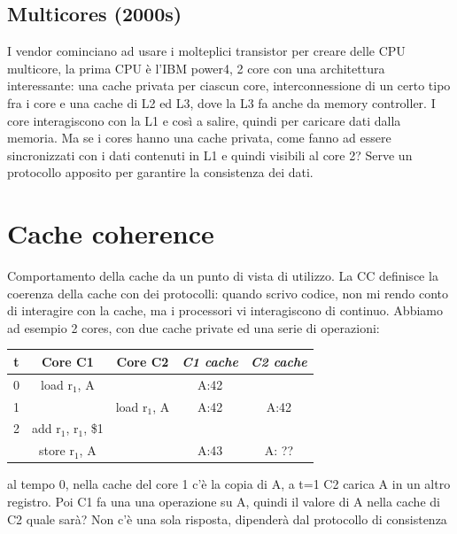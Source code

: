 \documentclass[12pt, oneside]{extbook} %
\begin{document}
\subsection{Multicores (2000s)}
I vendor cominciano ad usare i molteplici transistor per creare delle CPU multicore, la prima CPU è l'IBM power4, 2 core con una architettura interessante: una cache privata per ciascun core, interconnessione di un certo tipo fra i core e una cache di L2 ed L3, dove la L3 fa anche da memory controller. I core interagiscono con la L1 e così a salire, quindi per caricare dati dalla memoria. Ma se i cores hanno una cache privata, come fanno ad essere sincronizzati con i dati contenuti in L1 e quindi visibili al core 2? Serve un protocollo apposito per garantire la consistenza dei dati.

\section{Cache coherence}
Comportamento della cache da un punto di vista di utilizzo. La CC definisce la coerenza della cache con dei protocolli: quando scrivo codice, non mi rendo conto di interagire con la cache, ma i processori vi interagiscono di continuo. Abbiamo ad esempio 2 cores, con due cache private ed una serie di operazioni:
\begin{table}[!h]
	\begin{tabular}{|c|c|c|c|c|}
		t & \textbf{Core C1} & \textbf{
		Core C2} & \textit{C1 cache} & \textit{C2 cache}\\
		\hline
		0 & load r$_1$, A &  & A:42 & \\
		\hline
		1 &  & load r$_1$, A & A:42 & A:42\\
		\hline
		2 & add r$_1$, r$_1$, \$1 & & & \\
		\hline
		 & store r$_1$, A & & A:43 & A: ??\\
	\end{tabular}
\end{table}
al tempo 0, nella cache del core 1 c'è la copia di A, a t=1 C2 carica A in un altro registro. Poi C1 fa una una operazione su A, quindi il valore di A nella cache di C2 quale sarà? Non c'è una sola risposta, dipenderà dal protocollo di consistenza
\end{document}

